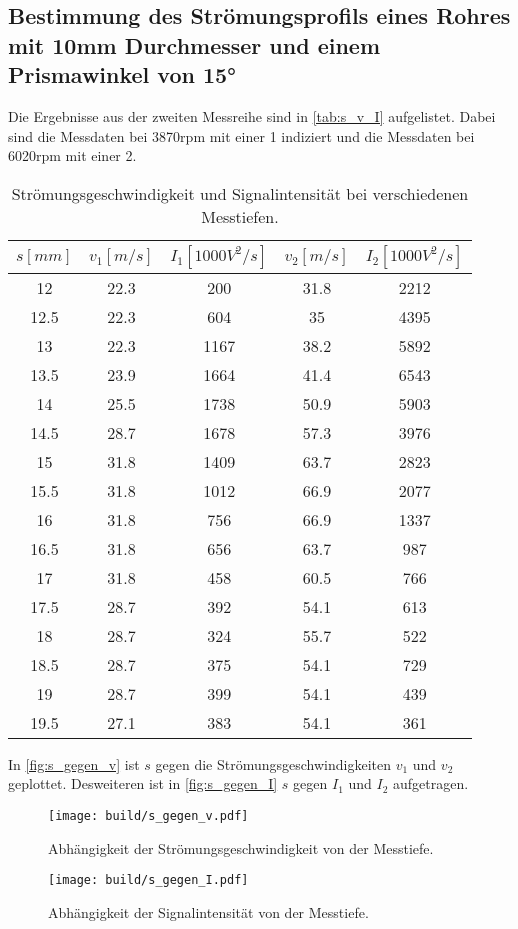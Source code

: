 \subsection{Bestimmung des Strömungsprofils eines Rohres mit 10mm Durchmesser und einem Prismawinkel von 15°}
Die Ergebnisse aus der zweiten Messreihe sind in \autoref{tab:s_v_I} aufgelistet. Dabei sind die Messdaten bei 3870rpm mit einer 1 indiziert und die 
Messdaten bei 6020rpm mit einer 2.
\begin{table}[H]
    \centering
    \caption{Strömungsgeschwindigkeit und Signalintensität bei verschiedenen Messtiefen.}
    \begin{tabular}{c c c c c}
        \toprule
        {$s [\unit{mm}]$} & {$v_{1} [\unit{m/s}]$} & {$I_{1} [\unit{1000V^2/s}]$} & {$v_{2} [\unit{m/s}]$} & {$I_{2} [\unit{1000V^2/s}]$} \\
        \midrule
        12   & 22.3 & 200  & 31.8 & 2212\\
        12.5 & 22.3 & 604  & 35   & 4395\\
        13   & 22.3 & 1167 & 38.2 & 5892\\
        13.5 & 23.9 & 1664 & 41.4 & 6543\\
        14   & 25.5 & 1738 & 50.9 & 5903\\
        14.5 & 28.7 & 1678 & 57.3 & 3976\\
        15   & 31.8 & 1409 & 63.7 & 2823\\
        15.5 & 31.8 & 1012 & 66.9 & 2077\\
        16   & 31.8 & 756  & 66.9 & 1337\\
        16.5 & 31.8 & 656  & 63.7 & 987\\
        17   & 31.8 & 458  & 60.5 & 766\\
        17.5 & 28.7 & 392  & 54.1 & 613\\
        18   & 28.7 & 324  & 55.7 & 522\\
        18.5 & 28.7 & 375  & 54.1 & 729\\
        19   & 28.7 & 399  & 54.1 & 439\\
        19.5 & 27.1 & 383  & 54.1 & 361\\
        \bottomrule
    \end{tabular}
    \label{tab:s_v_I}
\end{table}
In \autoref{fig:s_gegen_v} ist $s$ gegen die Strömungsgeschwindigkeiten $v_1$ und $v_2$ geplottet. Desweiteren ist in \autoref{fig:s_gegen_I} $s$ gegen $I_1$ und $I_2$ aufgetragen.
\begin{figure}[H]
    \texttt{[image: build/s\_gegen\_v.pdf]}
    \caption{Abhängigkeit der Strömungsgeschwindigkeit von der Messtiefe.}
    \label{fig:s_gegen_v}
\end{figure}
\begin{figure}[H]
    \texttt{[image: build/s\_gegen\_I.pdf]}
    \caption{Abhängigkeit der Signalintensität von der Messtiefe.}
    \label{fig:s_gegen_I}
\end{figure}